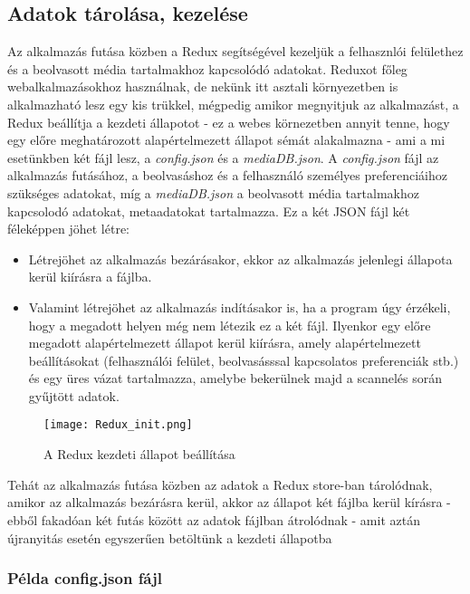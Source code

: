 \subsection{Adatok tárolása, kezelése}
Az alkalmazás futása közben a Redux segítségével kezeljük a felhasznlói felülethez és a beolvasott média tartalmakhoz kapcsolódó adatokat. Reduxot főleg webalkalmazásokhoz használnak, de nekünk itt asztali környezetben is alkalmazható lesz egy kis trükkel, mégpedig amikor megnyitjuk az alkalmazást, a Redux beállítja a kezdeti állapotot - ez a webes körnezetben annyit tenne, hogy egy előre meghatározott alapértelmezett állapot sémát alakalmazna - ami a mi esetünkben két fájl lesz, a {\it config.json} és a {\it mediaDB.json}. A {\it config.json} fájl az alkalmazás futásához, a beolvasáshoz és a felhasználó személyes preferenciáihoz szükséges adatokat, míg a {\it mediaDB.json} a beolvasott média tartalmakhoz kapcsolodó adatokat, metaadatokat tartalmazza. Ez a két JSON fájl két féleképpen jöhet létre:
\begin{itemize}
    \item Létrejöhet az alkalmazás bezárásakor, ekkor az alkalmazás jelenlegi állapota kerül kiírásra a fájlba.
    \item Valamint létrejöhet az alkalmazás indításakor is, ha a program úgy érzékeli, hogy a megadott helyen még nem létezik ez a két fájl. Ilyenkor egy előre megadott alapértelmezett állapot kerül kiírásra, amely alapértelmezett beállításokat (felhasználói felület, beolvasásssal kapcsolatos preferenciák stb.) és egy üres vázat tartalmazza, amelybe bekerülnek majd a scannelés során gyűjtött adatok.
\end{itemize}

\begin{figure}[H]
	\centering
	\texttt{[image: Redux\_init.png]}
	\caption{A Redux kezdeti állapot beállítása}
	\label{fig:redux-init}
\end{figure}

Tehát az alkalmazás futása közben az adatok a Redux store-ban tárolódnak, amikor az alkalmazás bezárásra kerül, akkor az állapot két fájlba kerül kírásra - ebből fakadóan két futás között az adatok fájlban átrolódnak - amit aztán újranyitás esetén egyszerűen betöltünk a kezdeti állapotba

\subsubsection{Példa config.json fájl}

